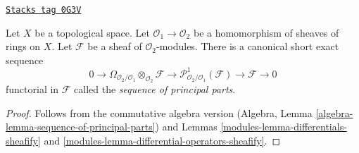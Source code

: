 \begin{lemma}
\label{modules-lemma-sequence-of-principal-parts}
\href{https://stacks.math.columbia.edu/tag/0G3V}{\texttt{Stacks tag 0G3V}}

Let $X$ be a topological space. Let $\mathcal{O}_1 \to \mathcal{O}_2$
be a homomorphism of sheaves of rings on $X$. Let $\mathcal{F}$ be a
sheaf of $\mathcal{O}_2$-modules. There is a
canonical short exact sequence
$$
0 \to
\Omega_{\mathcal{O}_2/\mathcal{O}_1} \otimes_{\mathcal{O}_2} \mathcal{F} \to
\mathcal{P}^1_{\mathcal{O}_2/\mathcal{O}_1}(\mathcal{F}) \to
\mathcal{F} \to 0
$$
functorial in $\mathcal{F}$ called the {\it sequence of principal parts}.
\end{lemma}

\begin{proof}

Follows from the commutative algebra version
(Algebra, Lemma \ref{algebra-lemma-sequence-of-principal-parts})
and Lemmas \ref{modules-lemma-differentials-sheafify} and
\ref{modules-lemma-differential-operators-sheafify}.
\end{proof}

